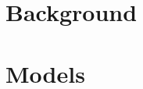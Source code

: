 \documentclass[12pt]{report}
\begin{document}




\tableofcontents

\listoffigures
\listoftables
\listoflistings{}

\glsaddall{}
\printglossary{}

\part{Background}




\part{Models}







\printbibliography{}
\end{document}
